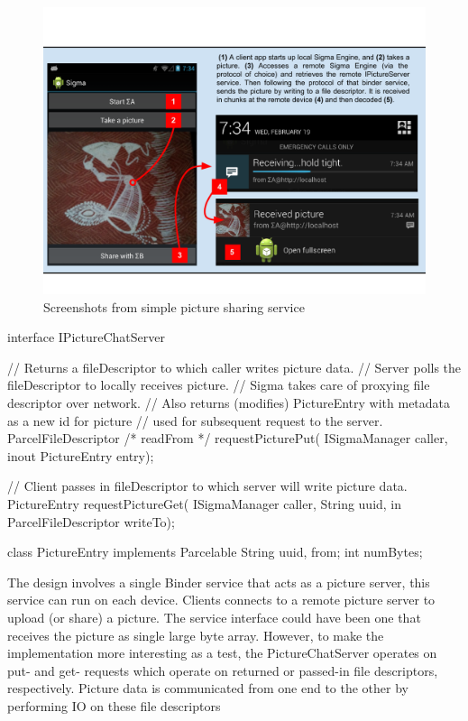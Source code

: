 \documentclass[prodmode]{acmlarge}
\begin{document}
\begin{figure}[h]
\centering
\includegraphics[width=\textwidth]{drawings/PictureChatExample.pdf}
\caption{Screenshots from simple picture sharing service}
\label{sec:ExampleApplication}
\end{figure}

\begin{snippet}
interface IPictureChatServer {
  // Returns a fileDescriptor to which caller writes picture data.
  // Server polls the fileDescriptor to locally receives picture.
  // Sigma takes care of proxying file descriptor over network.
  // Also returns (modifies) PictureEntry with metadata as a new id for picture
  // used for subsequent request to the server.
  ParcelFileDescriptor /* readFrom */ requestPicturePut(
    ISigmaManager caller, inout PictureEntry entry);

  // Client passes in fileDescriptor to which server will write picture data.
  PictureEntry requestPictureGet(
    ISigmaManager caller, String uuid, in ParcelFileDescriptor writeTo);
}

class PictureEntry implements Parcelable {
    String uuid, from;
    int numBytes;
}
\end{snippet}

The design involves a single Binder service that acts as a picture server, this service can run on each device. Clients connects to a remote picture server to upload (or share) a picture. The service interface could have been one that receives the picture as single large byte array. However, to make the implementation more interesting as a test, the PictureChatServer operates on put- and get- requests which operate on returned or passed-in file descriptors, respectively. Picture data is communicated from one end to the other by performing IO on these file descriptors
\end{document}
